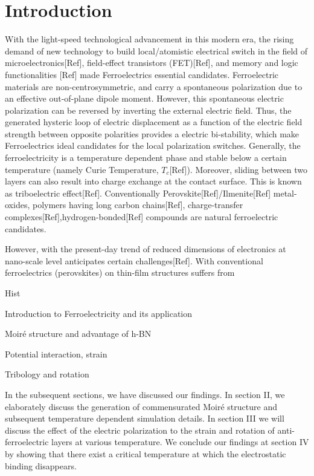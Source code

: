 \documentclass[apsrev,prl,twocolumn,superscriptaddress]{revtex4-2}
\begin{document}
\section{Introduction}
With the light-speed technological advancement in this modern era, the rising demand of new technology to build local/atomistic electrical switch in the field of microelectronics[Ref], field-effect transistors (FET)[Ref], and memory and logic functionalities [Ref] made Ferroelectrics essential candidates. Ferroelectric materials are non-centrosymmetric, and carry a spontaneous polarization due to an effective out-of-plane dipole moment. However, this spontaneous electric polarization can be reversed by inverting the external electric field. Thus, the generated hysteric loop of electric displacement as a function of the electric field strength between opposite polarities provides a electric bi-stability, which make Ferroelectrics ideal candidates for the local polarization switches. Generally, the ferroelectricity is a temperature dependent phase and stable below a certain temperature (namely Curie Temperature, $T_c$[Ref]). Moreover, sliding between two layers can also result into charge exchange at the contact surface. This is known as triboelectric effect[Ref]. Conventionally Perovskite[Ref]/Ilmenite[Ref] metal-oxides, polymers having long carbon chains[Ref], charge-transfer complexes[Ref],hydrogen-bonded[Ref] compounds are natural ferroelectric candidates.

However, with the present-day trend of reduced dimensions of electronics at nano-scale level anticipates certain challenges[Ref]. With conventional ferroelectrics (perovskites) on thin-film structures suffers from  

Hist



Introduction to Ferroelectricity and its application

Moir\'{e} structure and advantage of h-BN 

Potential interaction, strain

Tribology and rotation


In the subsequent sections, we have discussed our findings. In section II, we elaborately discuss the generation of commensurated Moir\'{e} structure and subsequent temperature dependent simulation details. In section III we will discuss the effect of the electric polarization to the strain and rotation of anti-ferroelectric layers at various temperature. We conclude our  findings at section IV by showing that there exist a critical temperature at which the electrostatic binding disappears.
\end{document}
